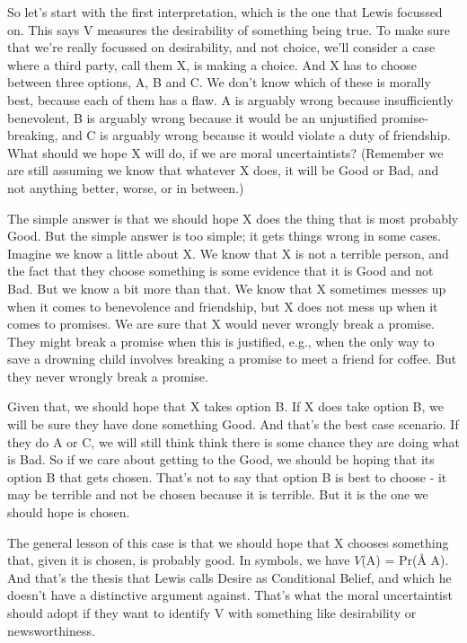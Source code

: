 So let's start with the first interpretation, which is the one that Lewis focussed on. This says V measures the desirability of something being true. To make sure that we're really focussed on desirability, and not choice, we'll consider a case where a third party, call them X, is making a choice. And X has to choose between three options, A, B and C. We don't know which of these is morally best, because each of them has a flaw. A is arguably wrong because insufficiently benevolent, B is arguably wrong because it would be an unjustified promise-breaking, and C is arguably wrong because it would violate a duty of friendship. What should we hope X will do, if we are moral uncertaintists? (Remember we are still assuming we know that whatever X does, it will be Good or Bad, and not anything better, worse, or in between.)

The simple answer is that we should hope X does the thing that is most probably Good. But the simple answer is too simple; it gets things wrong in some cases. Imagine we know a little about X. We know that X is not a terrible person, and the fact that they choose something is some evidence that it is Good and not Bad. But we know a bit more than that. We know that X sometimes messes up when it comes to benevolence and friendship, but X does not mess up when it comes to promises. We are sure that X would never wrongly break a promise. They might break a promise when this is justified, e.g., when the only way to save a drowning child involves breaking a promise to meet a friend for coffee. But they never wrongly break a promise.

Given that, we should hope that X takes option B. If X does take option B, we will be sure they have done something Good. And that's the best case scenario. If they do A or C, we will still think think there is some chance they are doing what is Bad. So if we care about getting to the Good, we should be hoping that its option B that gets chosen. That's not to say that option B is best to choose - it may be terrible and not be chosen because it is terrible. But it is the one we should hope is chosen.

The general lesson of this case is that we should hope that X chooses something that, given it is chosen, is probably good. In symbols, we have $V$(A) = Pr(Å \textbar{} A). And that's the thesis that Lewis calls Desire as Conditional Belief, and which he doesn't have a distinctive argument against. That's what the moral uncertaintist should adopt if they want to identify V with something like desirability or newsworthiness.

